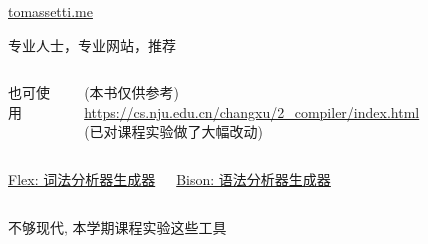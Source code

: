 \begin{frame}{}

  \begin{center}
    \href{https://tomassetti.me/}{tomassetti.me}

    \vspace{0.30cm}
    专业人士，专业网站，推荐
  \end{center}
\end{frame}

\begin{frame}{}
  \begin{columns}
    \begin{center}
      也可使用
    \end{center}
    \begin{center}
      (本书仅供参考)
      \url{https://cs.nju.edu.cn/changxu/2_compiler/index.html} \\[3pt]
      (已对课程实验做了大幅改动)
    \end{center}
  \end{columns}
\end{frame}

\begin{frame}{}
  \begin{columns}
    \begin{center}
      \href{https://en.wikipedia.org/wiki/Flex_(lexical_analyser_generator)}{\footnotesize Flex: 词法分析器生成器}
    \end{center}
    \begin{center}
      \href{https://en.wikipedia.org/wiki/GNU_Bison}{\footnotesize Bison: 语法分析器生成器}
    \end{center}
  \end{columns}

  \vspace{0.50cm}
  \begin{center}
    不够现代, 本学期课程实验这些工具
  \end{center}
\end{frame}


